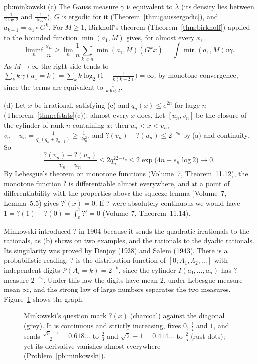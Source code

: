 \begin{solution}{pb:minkowski}
(c) The Gauss measure $\gamma$ is equivalent to $\lambda$ (its density lies between $\frac1{2\log2}$ and $\frac1{\log2}$), $G$ is ergodic for it (Theorem~\ref{thm:gaussergodic}),
and $a_{k+1}=a_1\circ G^k$. For $M\ge1$, Birkhoff's theorem (Theorem~\ref{thm:birkhoff}) applied to the bounded function $\min(a_1,M)$ gives, for almost every $x$,
\[
\liminf_n\frac{s_n}n\ge\lim_n\frac1n\sum_{k<n}\min(a_1,M)(G^kx)=\int\min(a_1,M)\dd\gamma.
\]
As $M\to\infty$ the right side tends to $\sum_kk\,\gamma(a_1=k)=\sum_kk\log_2\bigl(1+\frac1{k(k+2)}\bigr)=\infty$, by monotone convergence, since the terms are
equivalent to $\frac1{k\log2}$.

(d) Let $x$ be irrational, satisfying (c) and $q_n(x)\le e^{2n}$ for large $n$ (Theorem~\ref{thm:cfstats}(c)): almost every $x$ does. Let $[u_n,v_n]$ be the closure of the
cylinder of rank $n$ containing $x$; then $u_n<x<v_n$, $v_n-u_n=\frac1{q_n(q_n+q_{n-1})}\ge\frac1{2q_n^2}$, and $?(v_n)-?(u_n)\le2^{-s_n}$ by (a) and continuity. So
\[
\frac{?(v_n)-?(u_n)}{v_n-u_n}\le2q_n^22^{-s_n}\le2\exp\bigl(4n-s_n\log2\bigr)\longrightarrow0.
\]
By Lebesgue's theorem on monotone functions (Volume~7, Theorem~11.12), the monotone function $?$ is differentiable almost everywhere, and at a point of differentiability with the properties above
the squeeze lemma (Volume~7, Lemma~5.5) gives $?'(x)=0$. If $?$ were absolutely continuous we would have $1=?(1)-?(0)=\int_0^1?'=0$ (Volume~7, Theorem~11.14).

\leads Minkowski introduced $?$ in 1904 because it sends the quadratic irrationals to the rationals, as (b) shows on two examples, and the rationals to the dyadic
rationals. Its singularity was proved by Denjoy (1938) and Salem (1943). There is a probabilistic reading: $?$ is the distribution function of $[0;A_1,A_2,\dots]$ with
independent digits $P(A_i=k)=2^{-k}$, since the cylinder $I(a_1,\dots,a_n)$ has $?$-measure $2^{-s_n}$. Under this law the digits have mean $2$, under Lebesgue measure
mean $\infty$, and the strong law of large numbers separates the two measures. Figure~\ref{fig:minkowski} shows the graph.
\end{solution}

\begin{figure}[ht]
\centering
{}
\caption{Minkowski's question mark $?(x)$ (charcoal) against the diagonal (grey). It is continuous and strictly increasing, fixes $0$, $\frac12$ and $1$, and sends
$\frac{\sqrt5-1}2=0.618\ldots$ to $\frac23$ and $\sqrt2-1=0.414\ldots$ to $\frac25$ (rust dots); yet its derivative vanishes almost everywhere
(Problem~\ref{pb:minkowski}).}\label{fig:minkowski}
\end{figure}


